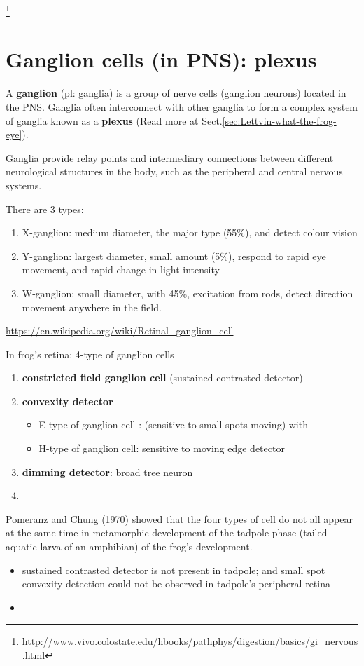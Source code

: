 \footnote{\url{http://www.vivo.colostate.edu/hbooks/pathphys/digestion/basics/gi_nervous.html}}


\section{Ganglion cells (in PNS): plexus}
\label{sec:ganglion}
\label{sec:plexus}

A {\bf ganglion} (pl: ganglia) is a group of nerve cells (ganglion
neurons) located in the PNS.  Ganglia often interconnect with other ganglia to
form a complex system of ganglia known as a {\bf plexus} (Read more at
Sect.\ref{sec:Lettvin-what-the-frog-eye}).

Ganglia provide relay points and intermediary connections between different
neurological structures in the body, such as the peripheral and central nervous
systems.

There are 3 types:
\begin{enumerate}
  \item X-ganglion: medium diameter, the major type (55\%), and detect colour
  vision
  
  \item Y-ganglion: largest diameter, small amount (5\%), respond to rapid eye
  movement, and rapid change in light intensity
  
  \item W-ganglion: small diameter, with 45\%, excitation from rods, detect
  direction movement anywhere in the field.
\end{enumerate}
\url{https://en.wikipedia.org/wiki/Retinal_ganglion_cell}

In frog's retina: 4-type of ganglion cells
\begin{enumerate}
  \item {\bf constricted field ganglion cell} (sustained contrasted detector)
  
  \item {\bf convexity detector} 
  \begin{itemize}
    \item  E-type of ganglion cell : (sensitive to small spots moving) with 
    \item  H-type of ganglion cell: sensitive to moving edge detector
  \end{itemize}
  
  \item {\bf dimming detector}: broad tree neuron
   
  \item {\bf }
\end{enumerate}
Pomeranz and Chung (1970) showed that the four types of cell do not all appear
at the same time in metamorphic development of the tadpole phase (tailed aquatic
larva of an amphibian) of the frog's development. 
\begin{itemize}
  \item sustained contrasted detector is not present in tadpole; and small spot
  convexity detection could not be observed in tadpole's peripheral retina
  
  \item 
\end{itemize}

